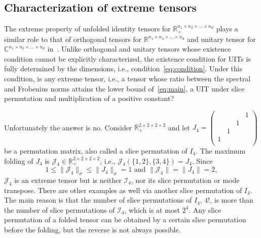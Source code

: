 \documentclass[11pt]{article}
\newcommand{\C}{\mathbb{C}}
\newcommand{\R}{\mathbb{R}}
\newcommand{\II}{\mathcal{I}}
\newcommand{\JJ}{\mathcal{J}}
\begin{document}
\subsection{Characterization of extreme tensors}\label{sec:picutre}

The extreme property of unfolded identity tensors for $\R^{n_1\times n_2\times \dots\times n_d}_+$ plays a similar role to that of orthogonal tensors for $\R^{n_1\times n_2\times \dots\times n_d}$ and unitary tensor for $\C^{n_1\times n_2\times \dots\times n_d}$ in~\cite{LNSU18}. Unlike orthogonal and unitary tensors whose existence condition cannot be explicitly characterized, the existence condition for UITs is fully determined by the dimensions, i.e., condition~\eqref{eq:condition}. Under this condition, is any extreme tensor, i.e., a tensor whose ratio between the spectral and Frobenius norms attains the lower bound of~\eqref{eq:main}, a UIT under slice permutation and multiplication of a positive constant?

Unfortunately the answer is no. Consider $\R^{2\times 2\times 2\times 2}_+$ and let $J_4=\left(
  \begin{array}{cccc}
     &  &  & 1 \\
     &  & 1 &  \\
     & 1 &  &  \\
    1 &  &  &  \\
  \end{array}
\right)$ be a permutation matrix, also called a slice permutation of $I_4$. The maximum folding of $J_4$ is $\JJ_4\in\R^{2\times 2\times 2\times 2}_+$, i.e., $\JJ_4(\{1,2\},\{3,4\})=J_4$. Since
$$
1\le \|\JJ_4\|_\sigma\le \|J_4\|_\sigma=1 \mbox{ and } \|\JJ_4\|= \|J_4\|=2,
$$
$\JJ_4$ is an extreme tensor but is neither $\II_4$, nor its slice permutation or mode transpose. There are other examples as well via another slice permutation of $I_4$. The main reason is that the number of slice permutations of $I_4$, $4!$, is more than the number of slice permutations of $\II_4$, which is at most $2^4$. Any slice permutation of a folded tensor can be obtained by a certain slice permutation before the folding, but the reverse is not always possible.
\end{document}
